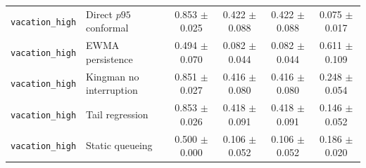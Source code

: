 \begin{tabular}{llcccc}
\texttt{vacation\_high} & Direct $p95$ conformal & 0.853 $\pm$ 0.025 & 0.422 $\pm$ 0.088 & 0.422 $\pm$ 0.088 & 0.075 $\pm$ 0.017 \\
\texttt{vacation\_high} & EWMA persistence & 0.494 $\pm$ 0.070 & 0.082 $\pm$ 0.044 & 0.082 $\pm$ 0.044 & 0.611 $\pm$ 0.109 \\
\texttt{vacation\_high} & Kingman no interruption & 0.851 $\pm$ 0.027 & 0.416 $\pm$ 0.080 & 0.416 $\pm$ 0.080 & 0.248 $\pm$ 0.054 \\
\texttt{vacation\_high} & Tail regression & 0.853 $\pm$ 0.026 & 0.418 $\pm$ 0.091 & 0.418 $\pm$ 0.091 & 0.146 $\pm$ 0.052 \\
\texttt{vacation\_high} & Static queueing & 0.500 $\pm$ 0.000 & 0.106 $\pm$ 0.052 & 0.106 $\pm$ 0.052 & 0.186 $\pm$ 0.020 \\
\hline
\end{tabular}

